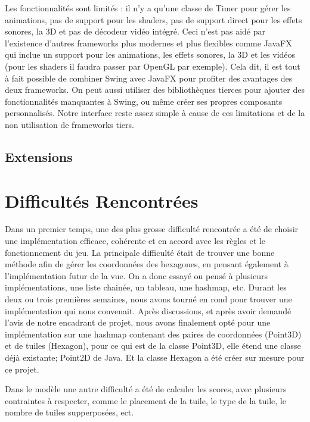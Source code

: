 \documentclass{article}
\begin{document}
    Les fonctionnalités sont limités : il n'y a qu'une classe de Timer pour gérer les animations, pas de support pour les shaders, pas de support direct pour les effets sonores, la 3D et pas de décodeur vidéo intégré.
    Ceci n'est pas aidé par l'existence d'autres frameworks plus modernes et plus flexibles comme JavaFX qui inclue un support pour les animations, les effets sonores, la 3D et les vidéos (pour les shaders il faudra passer par OpenGL par exemple).
    Cela dit, il est tout à fait possible de combiner Swing avec JavaFX pour profiter des avantages des deux frameworks.
    On peut aussi utiliser des bibliothèques tierces pour ajouter des fonctionnalités manquantes à Swing, ou même créer ses propres composants personnalisés.
    Notre interface reste assez simple à cause de ces limitations et de la non utilisation de frameworks tiers.    
    
    
    \subsection{Extensions}\label{subsec:extensions}

    \section{Difficultés Rencontrées}\label{sec:difficultes-rencontrees}

    Dans un premier temps, une des plus grosse difficulté rencontrée a été de choisir une implémentation efficace, cohérente et en accord avec les règles et le fonctionnement du jeu.
    La principale difficulté était de trouver une bonne méthode afin de gérer les coordonnées des hexagones, en pensant également à l'implémentation futur de la vue.
    On a donc essayé ou pensé à plusieurs implémentations, une liste chainée, un tableau, une hashmap, etc.
    Durant les deux ou trois premières semaines, nous avons tourné en rond pour trouver une implémentation qui nous convenait.
    Après discussions, et après avoir demandé l'avis de notre encadrant de projet, nous avons finalement opté pour une implémentation sur une hashmap contenant des paires de coordonnées (Point3D) et de tuiles (Hexagon), pour ce qui est de la classe Point3D, elle étend une classe déjà existante; Point2D de Java.
    Et la classe Hexagon a été créer sur mesure pour ce projet.

    Dans le modèle une autre difficulté a été de calculer les scores, avec plusieurs contraintes à respecter, comme le placement de la tuile, le type de la tuile, le nombre de tuiles supperposées, ect.
\end{document}
